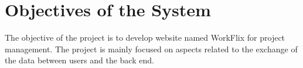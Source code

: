 \section{Objectives of the System}
The objective of the project is to develop website named WorkFlix for project management. The project is mainly
focused on aspects related to the exchange of the data between users and the back end.